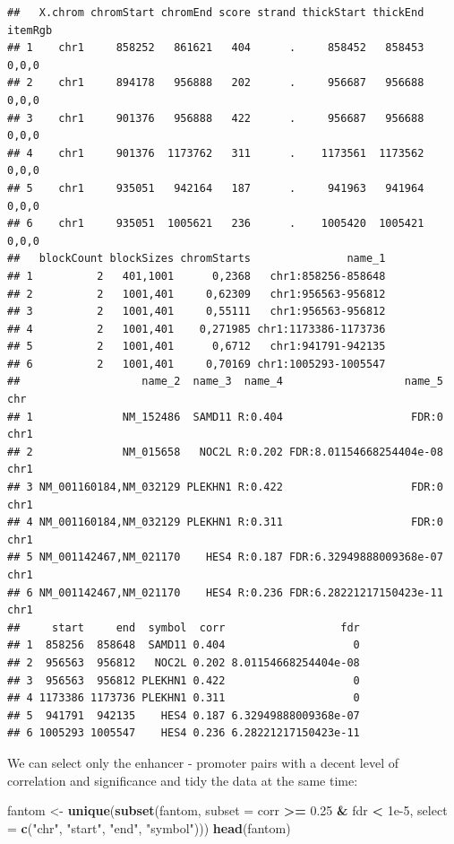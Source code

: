 \documentclass[9pt,a4paper,]{extarticle}
\newenvironment{Shaded}{\begin{snugshade}}{\end{snugshade}}
\newcommand{\KeywordTok}[1]{\textcolor[rgb]{0.13,0.29,0.53}{\textbf{#1}}}
\newcommand{\DataTypeTok}[1]{\textcolor[rgb]{0.13,0.29,0.53}{#1}}
\newcommand{\FloatTok}[1]{\textcolor[rgb]{0.00,0.00,0.81}{#1}}
\newcommand{\StringTok}[1]{\textcolor[rgb]{0.31,0.60,0.02}{#1}}
\newcommand{\OperatorTok}[1]{\textcolor[rgb]{0.81,0.36,0.00}{\textbf{#1}}}
\newcommand{\NormalTok}[1]{#1}
\begin{document}
\begin{verbatim}
##   X.chrom chromStart chromEnd score strand thickStart thickEnd itemRgb
## 1    chr1     858252   861621   404      .     858452   858453   0,0,0
## 2    chr1     894178   956888   202      .     956687   956688   0,0,0
## 3    chr1     901376   956888   422      .     956687   956688   0,0,0
## 4    chr1     901376  1173762   311      .    1173561  1173562   0,0,0
## 5    chr1     935051   942164   187      .     941963   941964   0,0,0
## 6    chr1     935051  1005621   236      .    1005420  1005421   0,0,0
##   blockCount blockSizes chromStarts               name_1
## 1          2   401,1001      0,2368   chr1:858256-858648
## 2          2   1001,401     0,62309   chr1:956563-956812
## 3          2   1001,401     0,55111   chr1:956563-956812
## 4          2   1001,401    0,271985 chr1:1173386-1173736
## 5          2   1001,401      0,6712   chr1:941791-942135
## 6          2   1001,401     0,70169 chr1:1005293-1005547
##                   name_2  name_3  name_4                   name_5  chr
## 1              NM_152486  SAMD11 R:0.404                    FDR:0 chr1
## 2              NM_015658   NOC2L R:0.202 FDR:8.01154668254404e-08 chr1
## 3 NM_001160184,NM_032129 PLEKHN1 R:0.422                    FDR:0 chr1
## 4 NM_001160184,NM_032129 PLEKHN1 R:0.311                    FDR:0 chr1
## 5 NM_001142467,NM_021170    HES4 R:0.187 FDR:6.32949888009368e-07 chr1
## 6 NM_001142467,NM_021170    HES4 R:0.236 FDR:6.28221217150423e-11 chr1
##     start     end  symbol  corr                  fdr
## 1  858256  858648  SAMD11 0.404                    0
## 2  956563  956812   NOC2L 0.202 8.01154668254404e-08
## 3  956563  956812 PLEKHN1 0.422                    0
## 4 1173386 1173736 PLEKHN1 0.311                    0
## 5  941791  942135    HES4 0.187 6.32949888009368e-07
## 6 1005293 1005547    HES4 0.236 6.28221217150423e-11
\end{verbatim}

We can select only the enhancer - promoter pairs with a decent level of correlation and significance and tidy the data at the same time:

\begin{Shaded}
\begin{Highlighting}[]
\NormalTok{fantom <-}\StringTok{ }\KeywordTok{unique}\NormalTok{(}\KeywordTok{subset}\NormalTok{(fantom, }\DataTypeTok{subset =}\NormalTok{ corr }\OperatorTok{>=}\StringTok{ }\FloatTok{0.25} \OperatorTok{&}\StringTok{ }\NormalTok{fdr }\OperatorTok{<}\StringTok{ }\FloatTok{1e-5}\NormalTok{, }\DataTypeTok{select =} \KeywordTok{c}\NormalTok{(}\StringTok{"chr"}\NormalTok{, }\StringTok{"start"}\NormalTok{, }\StringTok{"end"}\NormalTok{, }\StringTok{"symbol"}\NormalTok{)))}
\KeywordTok{head}\NormalTok{(fantom)}
\end{Highlighting}
\end{Shaded}
\end{document}
